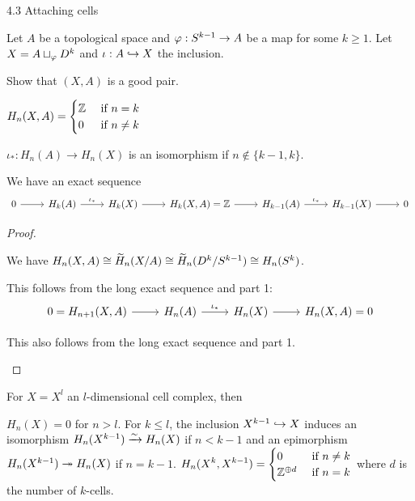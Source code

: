 4.3 Attaching cells

Let $A$ be a topological space and $\varphi: S^{k-1} \to A$ be a map for some $k \geq 1$.
Let $X = A \sqcup_\varphi D^k$ and $\iota: A \hookrightarrow X$ the inclusion.

\begin{exer}
  Show that $(X,A)$ is a good pair.
\end{exer}

\begin{prop}
  \lv
  \begin{enum}
    \io
    $\displaystyle H_n(X,A)=
    \begin{cases}
      \mathbb{Z} &\text{ if } n=k \\
      0 &\text{ if } n \neq k
    \end{cases}$

    \io
    $\iota_*: H_n(A) \to H_n(X)$ is an isomorphism if $n \notin \{k-1,k\}$.
    
    \io
    We have an exact sequence
    \begin{equation*}
      \begin{tikzcd}
	0 \ar[r] & H_k(A) \ar[r, "\iota_*"] & H_k(X) \ar[r] & H_k(X,A)=\ZZ \ar[r] & H_{k-1}(A) \ar[r, "\iota_*"] & H_{k-1}(X) \ar[r] & 0
      \end{tikzcd}
    \end{equation*}
  \end{enum}
\end{prop}

\begin{proof}
  \lv
  \begin{enum}
    \io
    We have $H_n(X,A) \cong \widetilde H_n(X/A) \cong \widetilde H_n(D^k/S^{k-1}) \cong H_n(S^k)$.

    \io
    This follows from the long exact sequence and part 1:
    \begin{equation*}
      \begin{tikzcd}
      	0=H_{n+1}(X,A) \ar[r] & H_n(A) \ar[r, "\iota_*"] & H_n(X) \ar[r] & H_n(X,A)=0
      \end{tikzcd}
    \end{equation*}

    \io
    This also follows from the long exact sequence and part 1.
  \end{enum}
\end{proof}

\begin{cor}
  For $X=X^l$ an $l$-dimensional cell complex, then
  \begin{enum}
    \io $H_n(X)=0$ for $n>l$.
    \io For $k \leq l$, the inclusion $X^{k-1} \hookrightarrow X$ induces an isomorphism $H_n(X^{k-1}) \xrightarrow{\sim} H_n(X)$ if $n<k-1$ and an epimorphism $H_n(X^{k-1}) \twoheadrightarrow H_n(X)$ if $n=k-1$.
    \io $\displaystyle H_n(X^k,X^{k-1})=
    \begin{cases}
      0 &\text{ if } n \neq k \\
      \mathbb{Z}^{\oplus d} &\text{ if } n=k
    \end{cases}$
    where $d$ is the number of $k$-cells.
  \end{enum}
\end{cor}

